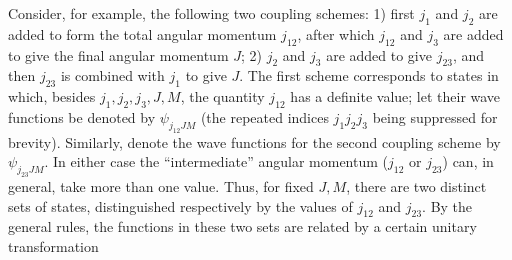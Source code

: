 Consider, for example, the following two coupling schemes: 1) first $j_1$ and $j_2$ are added to form the total angular momentum $j_{12}$, after which $j_{12}$ and $j_3$ are added to give the final angular momentum $J$; 2) $j_2$ and $j_3$ are added to give $j_{23}$, and then $j_{23}$ is combined with $j_1$ to give $J$. The first scheme corresponds to states in which, besides $j_1,j_2,j_3,J,M$, the quantity $j_{12}$ has a definite value; let their wave functions be denoted by $\psi_{j_{12}JM}$ (the repeated indices $j_1j_2j_3$ being suppressed for brevity). Similarly, denote the wave functions for the second coupling scheme by $\psi_{j_{23}JM}$. In either case the ``intermediate'' angular momentum ($j_{12}$ or $j_{23}$) can, in general, take more than one value. Thus, for fixed $J,M$, there are two distinct sets of states, distinguished respectively by the values of $j_{12}$ and $j_{23}$. By the general rules, the functions in these two sets are related by a certain unitary transformation
